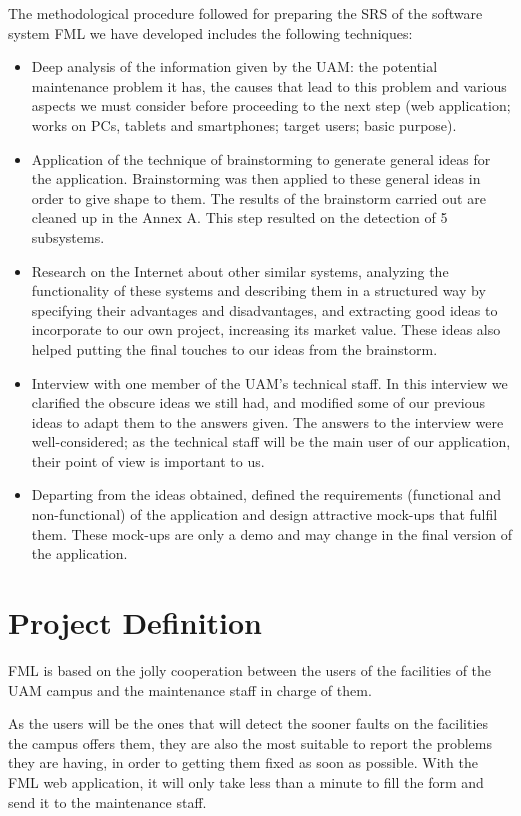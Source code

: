 \documentclass{report}
\begin{document}
The methodological procedure followed for preparing the SRS of the software system FML we have developed includes the following techniques:
\begin{itemize}
\item Deep analysis of the information given by the UAM: the potential maintenance problem it has, the causes that lead to this problem and various aspects we must consider before proceeding to the next step (web application;  works on PCs, tablets and smartphones; target users; basic purpose).
\item Application of the technique of brainstorming to generate general ideas for the application. Brainstorming was then applied to these general ideas in order to give shape to them. The results of the brainstorm carried out are cleaned up in the Annex A. This step resulted on the detection of 5 subsystems.
\item Research on the Internet about other similar systems, analyzing the functionality of these systems and describing them in a structured way by specifying their advantages and disadvantages, and extracting good ideas to incorporate to our own project, increasing its market value. These ideas also helped putting the final touches to our ideas from the brainstorm.
\item Interview with one member of the UAM's technical staff. In this interview we clarified the obscure ideas we still had, and modified some of our previous ideas to adapt them to the answers given. The answers to the interview were well-considered; as the technical staff will be the main user of our application, their point of view is important to us.
\item Departing from the ideas obtained, defined the requirements (functional and non-functional) of the application and design attractive mock-ups that fulfil them. These mock-ups are only a demo and may change in the final version of the application.
\end{itemize}

\chapter{Project Definition}

FML is based on the jolly cooperation between the users of the facilities of the UAM campus and the maintenance staff in charge of them. 

As the users will be the ones that will detect the sooner faults on the facilities the campus offers them, they are also the most suitable to report the problems they are having, in order to getting them fixed as soon as possible. With the FML web application, it will only take less than a minute to fill the form and send it to the maintenance staff. 
\end{document}
